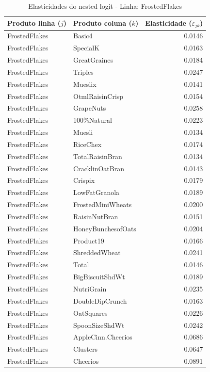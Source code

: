 \begingroup
\begin{table}[H]
\centering
\caption{Elasticidades do nested logit - Linha: FrostedFlakes}
\label{tab:elas-nested-frostedflakes}
\small
\begin{tabular}{llr}
\toprule
Produto linha ($j$) & Produto coluna ($k$) & Elasticidade ($\varepsilon_{jk}$) \\
\midrule
FrostedFlakes & Basic4 & 0.0146 \\
FrostedFlakes & SpecialK & 0.0163 \\
FrostedFlakes & GreatGraines & 0.0184 \\
FrostedFlakes & Triples & 0.0247 \\
FrostedFlakes & Mueslix & 0.0141 \\
FrostedFlakes & OtmlRaisinCrisp & 0.0154 \\
FrostedFlakes & GrapeNuts & 0.0258 \\
FrostedFlakes & 100\%Natural & 0.0223 \\
FrostedFlakes & Muesli & 0.0134 \\
FrostedFlakes & RiceChex & 0.0174 \\
FrostedFlakes & TotalRaisinBran & 0.0134 \\
FrostedFlakes & CracklinOatBran & 0.0143 \\
FrostedFlakes & Crispix & 0.0179 \\
FrostedFlakes & LowFatGranola & 0.0189 \\
FrostedFlakes & FrostedMiniWheats & 0.0200 \\
FrostedFlakes & RaisinNutBran & 0.0151 \\
FrostedFlakes & HoneyBunchesofOats & 0.0204 \\
FrostedFlakes & Product19 & 0.0166 \\
FrostedFlakes & ShreddedWheat & 0.0241 \\
FrostedFlakes & Total & 0.0146 \\
FrostedFlakes & BigBiscuitShdWt & 0.0189 \\
FrostedFlakes & NutriGrain & 0.0235 \\
FrostedFlakes & DoubleDipCrunch & 0.0163 \\
FrostedFlakes & OatSquares & 0.0226 \\
FrostedFlakes & SpoonSizeShdWt & 0.0242 \\
FrostedFlakes & AppleCinn.Cheerios & 0.0686 \\
FrostedFlakes & Clusters & 0.0647 \\
FrostedFlakes & Cheerios & 0.0891 \\

\end{tabular}
\end{table}
